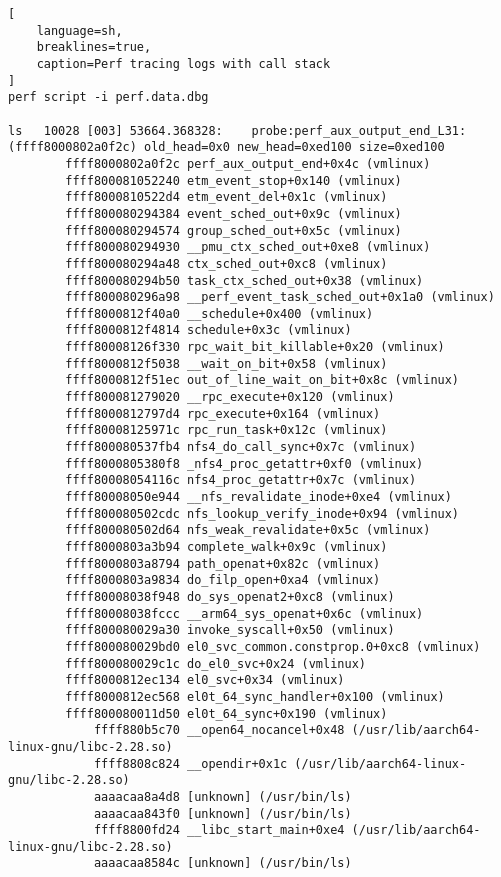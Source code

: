 \documentclass[11pt]{diazessay} %
\begin{document}
\begin{lstlisting}[
  	language=sh,
	breaklines=true,
	caption=Perf tracing logs with call stack
]
perf script -i perf.data.dbg

ls   10028 [003] 53664.368328:    probe:perf_aux_output_end_L31: (ffff8000802a0f2c) old_head=0x0 new_head=0xed100 size=0xed100
        ffff8000802a0f2c perf_aux_output_end+0x4c (vmlinux)
        ffff800081052240 etm_event_stop+0x140 (vmlinux)
        ffff8000810522d4 etm_event_del+0x1c (vmlinux)
        ffff800080294384 event_sched_out+0x9c (vmlinux)
        ffff800080294574 group_sched_out+0x5c (vmlinux)
        ffff800080294930 __pmu_ctx_sched_out+0xe8 (vmlinux)
        ffff800080294a48 ctx_sched_out+0xc8 (vmlinux)
        ffff800080294b50 task_ctx_sched_out+0x38 (vmlinux)
        ffff800080296a98 __perf_event_task_sched_out+0x1a0 (vmlinux)
        ffff8000812f40a0 __schedule+0x400 (vmlinux)
        ffff8000812f4814 schedule+0x3c (vmlinux)
        ffff80008126f330 rpc_wait_bit_killable+0x20 (vmlinux)
        ffff8000812f5038 __wait_on_bit+0x58 (vmlinux)
        ffff8000812f51ec out_of_line_wait_on_bit+0x8c (vmlinux)
        ffff800081279020 __rpc_execute+0x120 (vmlinux)
        ffff8000812797d4 rpc_execute+0x164 (vmlinux)
        ffff80008125971c rpc_run_task+0x12c (vmlinux)
        ffff800080537fb4 nfs4_do_call_sync+0x7c (vmlinux)
        ffff8000805380f8 _nfs4_proc_getattr+0xf0 (vmlinux)
        ffff80008054116c nfs4_proc_getattr+0x7c (vmlinux)
        ffff80008050e944 __nfs_revalidate_inode+0xe4 (vmlinux)
        ffff800080502cdc nfs_lookup_verify_inode+0x94 (vmlinux)
        ffff800080502d64 nfs_weak_revalidate+0x5c (vmlinux)
        ffff8000803a3b94 complete_walk+0x9c (vmlinux)
        ffff8000803a8794 path_openat+0x82c (vmlinux)
        ffff8000803a9834 do_filp_open+0xa4 (vmlinux)
        ffff80008038f948 do_sys_openat2+0xc8 (vmlinux)
        ffff80008038fccc __arm64_sys_openat+0x6c (vmlinux)
        ffff800080029a30 invoke_syscall+0x50 (vmlinux)
        ffff800080029bd0 el0_svc_common.constprop.0+0xc8 (vmlinux)
        ffff800080029c1c do_el0_svc+0x24 (vmlinux)
        ffff8000812ec134 el0_svc+0x34 (vmlinux)
        ffff8000812ec568 el0t_64_sync_handler+0x100 (vmlinux)
        ffff800080011d50 el0t_64_sync+0x190 (vmlinux)
            ffff880b5c70 __open64_nocancel+0x48 (/usr/lib/aarch64-linux-gnu/libc-2.28.so)
            ffff8808c824 __opendir+0x1c (/usr/lib/aarch64-linux-gnu/libc-2.28.so)
            aaaacaa8a4d8 [unknown] (/usr/bin/ls)
            aaaacaa843f0 [unknown] (/usr/bin/ls)
            ffff8800fd24 __libc_start_main+0xe4 (/usr/lib/aarch64-linux-gnu/libc-2.28.so)
            aaaacaa8584c [unknown] (/usr/bin/ls)


\end{lstlisting}
\end{document}
